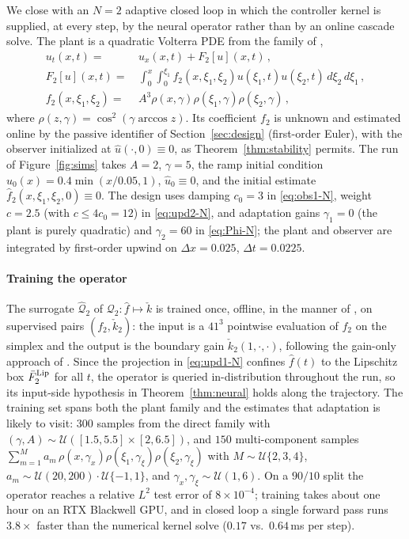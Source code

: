 \documentclass[journal,twoside,web]{ieeecolor}
\begin{document}
We close with an $N=2$ adaptive closed loop in which the controller kernel is supplied, at every step, by the neural operator rather than by an online cascade solve. The plant is a quadratic Volterra PDE from the family of \cite{HV3},
\begin{subequations}
\begin{align}
    u_t(x, t) =&\, u_x(x, t) + F_2[u](x, t)\,, \\
    F_2[u](x, t) =&\, \int_0^x \int_0^{\xi_1} f_2(x, \xi_1, \xi_2)u(\xi_1, t)u(\xi_2, t)\, d\xi_2\, d\xi_1\,, \\
    f_2(x, \xi_1, \xi_2) =&\, A^3 \rho(x, \gamma)\rho(\xi_1, \gamma)\rho(\xi_2, \gamma)\,,
\end{align}
\end{subequations}
where $\rho(z, \gamma) = \cos^2(\gamma\arccos z)$. Its coefficient $f_2$ is unknown and estimated online by the passive identifier of Section~\ref{sec:design} (first-order Euler), with the observer initialized at $\hat u(\cdot,0)\equiv0$, as Theorem~\ref{thm:stability} permits. The run of Figure~\ref{fig:sims} takes $A=2$, $\gamma=5$, the ramp initial condition $u_0(x)=0.4\min(x/0.05,1)$, $\hat u_0\equiv0$, and the initial estimate $\hat f_2(x,\xi_1,\xi_2,0)\equiv 0$. The design uses damping $c_0=3$ in \eqref{eq:obs1-N}, weight $c=2.5$ (with $c\le 4c_0=12$) in \eqref{eq:upd2-N}, and adaptation gains $\gamma_1=0$ (the plant is purely quadratic) and $\gamma_2=60$ in \eqref{eq:Phi-N}; the plant and observer are integrated by first-order upwind on $\Delta x=0.025$, $\Delta t=0.0225$.

\paragraph*{Training the operator} The surrogate $\widehat{\mathcal Q}_2$ of $\mathcal Q_2:\hat f\mapsto\check k$ is trained once, offline, in the manner of \cite{LBSK}, on supervised pairs $(f_2,\check k_2)$: the input is a $41^3$ pointwise evaluation of $f_2$ on the simplex and the output is the boundary gain $\check k_2(1,\cdot,\cdot)$, following the gain-only approach of \cite{VK241}. Since the projection in \eqref{eq:upd1-N} confines $\hat f(t)$ to the Lipschitz box $\bar F_2^{\rm Lip}$ for all $t$, the operator is queried in-distribution throughout the run, so its input-side hypothesis in Theorem~\ref{thm:neural} holds along the trajectory. The training set spans both the plant family and the estimates that adaptation is likely to visit: $300$ samples from the direct family with $(\gamma,A)\sim\mathcal U([1.5,5.5]\times[2,6.5])$, and $150$ multi-component samples $\sum_{m=1}^M a_m\,\rho(x,\gamma_x)\rho(\xi_1,\gamma_\xi)\rho(\xi_2,\gamma_\xi)$ with $M\sim\mathcal U\{2,3,4\}$, $a_m\sim\mathcal U(20,200)\cdot\mathcal U\{-1,1\}$, and $\gamma_x,\gamma_\xi\sim\mathcal U(1,6)$. On a $90/10$ split the operator reaches a relative $L^2$ test error of $8\times10^{-4}$; training takes about one hour on an RTX Blackwell GPU, and in closed loop a single forward pass runs $3.8\times$ faster than the numerical kernel solve ($0.17$ vs.\ $0.64$\,ms per step).
\end{document}
